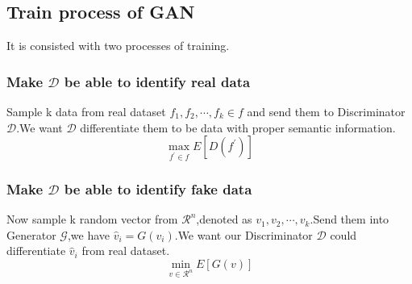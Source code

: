 \documentclass[
    ngerman,american
    ]{scrartcl}
\begin{document}
        \subsection{Train process of GAN}
        It is consisted with two processes of training.
        \subsubsection{Make $\mathcal D$ be able to identify real data}
        Sample k data from real dataset $f_1,f_2,\cdots,f_k\in f$ and send them to Discriminator $\mathcal D$.We want $\mathcal D$ differentiate them to be data with proper semantic information.
        \begin{equation}
            \max_{f^\prime \in f}E[D(f^\prime)]
        \end{equation}
        \subsubsection{Make $\mathcal D$ be able to identify fake data}
        Now sample k random vector from $\mathcal R^n$,denoted as $v_1,v_2,\cdots,v_k$.Send them into Generator $\mathcal G$,we have $\hat v_i = G(v_i)$.We want our Discriminator $\mathcal D$ could differentiate $\hat v_i$ from real dataset.
        \begin{equation}
            \min_{v\in \mathcal R^n} E[G(v)]
        \end{equation}
        
 
\end{document}

